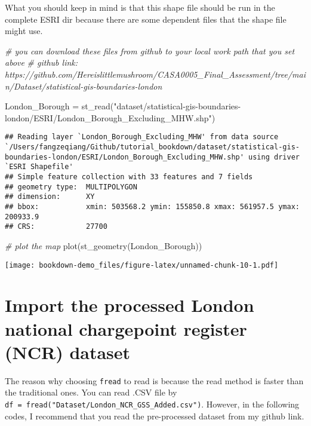 \documentclass[
]{book}
\newenvironment{Shaded}{\begin{snugshade}}{\end{snugshade}}
\newcommand{\CommentTok}[1]{\textcolor[rgb]{0.56,0.35,0.01}{\textit{#1}}}
\newcommand{\FunctionTok}[1]{\textcolor[rgb]{0.00,0.00,0.00}{#1}}
\newcommand{\NormalTok}[1]{#1}
\newcommand{\OtherTok}[1]{\textcolor[rgb]{0.56,0.35,0.01}{#1}}
\newcommand{\StringTok}[1]{\textcolor[rgb]{0.31,0.60,0.02}{#1}}
\begin{document}
What you should keep in mind is that this shape file should be run in the complete ESRI dir because there are some dependent files that the shape file might use.

\begin{Shaded}
\begin{Highlighting}[]
\CommentTok{\# you can download these files from github to your local work path that you set above}
\CommentTok{\# github link: https://github.com/Hereislittlemushroom/CASA0005\_Final\_Assessment/tree/main/Dataset/statistical{-}gis{-}boundaries{-}london}

\NormalTok{London\_Borough }\OtherTok{=} \FunctionTok{st\_read}\NormalTok{(}\StringTok{"dataset/statistical{-}gis{-}boundaries{-}london/ESRI/London\_Borough\_Excluding\_MHW.shp"}\NormalTok{)}
\end{Highlighting}
\end{Shaded}

\begin{verbatim}
## Reading layer `London_Borough_Excluding_MHW' from data source `/Users/fangzeqiang/Github/tutorial_bookdown/dataset/statistical-gis-boundaries-london/ESRI/London_Borough_Excluding_MHW.shp' using driver `ESRI Shapefile'
## Simple feature collection with 33 features and 7 fields
## geometry type:  MULTIPOLYGON
## dimension:      XY
## bbox:           xmin: 503568.2 ymin: 155850.8 xmax: 561957.5 ymax: 200933.9
## CRS:            27700
\end{verbatim}

\begin{Shaded}
\begin{Highlighting}[]
\CommentTok{\# plot the map}
\FunctionTok{plot}\NormalTok{(}\FunctionTok{st\_geometry}\NormalTok{(London\_Borough))}
\end{Highlighting}
\end{Shaded}

\texttt{[image: bookdown-demo\_files/figure-latex/unnamed-chunk-10-1.pdf]}

\hypertarget{import-the-processed-london-national-chargepoint-register-ncr-dataset}{%
\section{Import the processed London national chargepoint register (NCR) dataset}\label{import-the-processed-london-national-chargepoint-register-ncr-dataset}}

The reason why choosing \texttt{fread} to read is because the read method is faster than the traditional ones. You can read .CSV file by \texttt{df\ =\ fread("Dataset/London\_NCR\_GSS\_Added.csv")}. However, in the following codes, I recommend that you read the pre-processed dataset from my github link.
\end{document}
